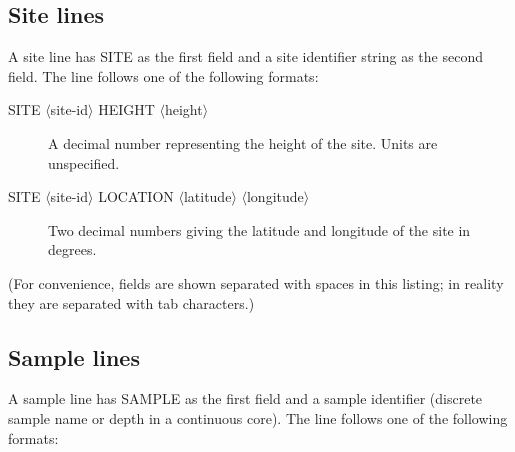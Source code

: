 \documentclass[a4paper,british]{article}
\newcommand{\ppcmd}[1]{\textsf{#1}} %
\begin{document}
\subsection{Site lines}

A site line has \ppcmd{SITE} as the first field and a site identifier string as the second
field. The line follows one of the following formats:

\begin{description}

\item[\ppcmd{SITE $\langle$site-id$\rangle$  HEIGHT $\langle$height$\rangle$ }] A decimal number representing the height of the site.
Units are unspecified.

\item[\ppcmd{SITE $\langle$site-id$\rangle$  LOCATION $\langle$latitude$\rangle$  $\langle$longitude$\rangle$ }] Two decimal numbers giving the latitude
and longitude of the site in degrees.

\end{description}

\noindent (For convenience, fields are shown separated with spaces in this listing;
in reality they are separated with tab characters.)

\subsection{Sample lines}

A sample line has \ppcmd{SAMPLE} as the first field and a sample identifier (discrete sample
name or depth in a continuous core). The line follows one of the following formats:
\end{document}
